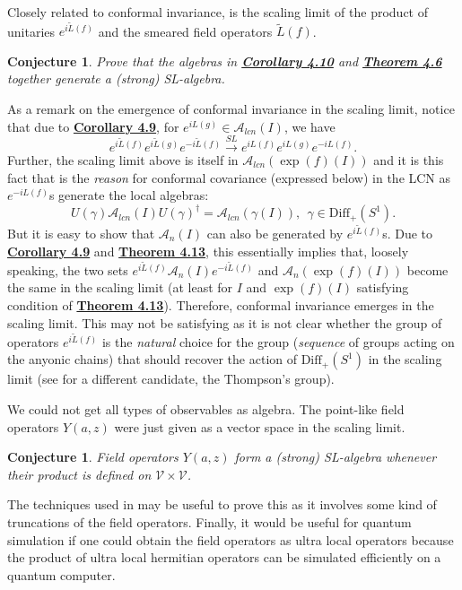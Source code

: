\documentclass[twoside,11pt,titlepage]{amsart}
\renewcommand{\=}[1]{\stackrel{#1}{=}} %
\newtheorem{cnj}[thm]{Conjecture}
\theoremstyle{definition}
\theoremstyle{remark}
\begin{document}
Closely related to conformal invariance, is the scaling limit of the product of unitaries $e^{i\widetilde{L}(f)}$ and the smeared field operators $\widetilde{L}(f)$.
\begin{cnj}\label{cnj5.3}
Prove that the algebras in \hyperref[cor4.10]{\textbf{Corollary 4.10}} and \hyperref[thm4.6]{\textbf{Theorem 4.6}} together generate a (strong) SL-algebra.
\end{cnj}

As a remark on the emergence of conformal invariance in the scaling limit, notice that due to \hyperref[cor4.9]{\textbf{Corollary 4.9}}, for $e^{iL(g)} \in \mathcal{A}_{lcn}(I)$, we have
$$e^{i\widetilde{L}(f)}e^{i\widetilde{L}(g)}e^{-i\widetilde{L}(f)} \xrightarrow{SL} e^{iL(f)}e^{iL(g)}e^{-iL(f)}.$$
Further, the scaling limit above is itself in $\mathcal{A}_{lcn}(\exp{(f)}(I))$ and it is this fact that is the \textit{reason} for conformal covariance (expressed below) in the LCN as $e^{-iL(f)}$s generate the local algebras:
$$U(\gamma)\mathcal{A}_{lcn}(I)U(\gamma)^\dagger=\mathcal{A}_{lcn}(\gamma(I)), \ \ \gamma \in \text{Diff}_+(S^1).$$
But it is easy to show that $\mathcal{A}_n(I)$ can also be generated by $e^{i\widetilde{L}(f)}$s. Due to \hyperref[cor4.9]{\textbf{Corollary 4.9}} and \hyperref[thm4.13]{\textbf{Theorem 4.13}}, this essentially implies that, loosely speaking, the two sets $e^{i\widetilde{L}(f)}\mathcal{A}_n(I)e^{-i\widetilde{L}(f)}$ and $\mathcal{A}_n(\exp{(f)}(I))$ become the same in the scaling limit (at least for $I$ and $\exp{(f)}(I)$ satisfying condition of \hyperref[thm4.13]{\textbf{Theorem 4.13}}). Therefore, conformal invariance emerges in the scaling limit. This may not be satisfying as it is not clear whether the group of operators $e^{i\widetilde{L}(f)}$ is the \textit{natural} choice for the group (\textit{sequence} of groups acting on the anyonic chains) that should recover the action of $\text{Diff}_+(S^1)$ in the scaling limit (see \cite{jones16} for a different candidate, the Thompson's group).

We could not get all types of observables as algebra. The point-like field operators $Y(a,z)$ were just given as a vector space in the scaling limit. 

\begin{cnj}\label{cnj5.4}
Field operators $Y(a,z)$ form a (strong) SL-algebra whenever their product is defined on $\mathcal{V} \times \mathcal{V}$.
\end{cnj}
The techniques used in \cite{konig2017matrix} may be useful to prove this as it involves some kind of truncations of the field operators. Finally, it would be useful for quantum simulation if one could obtain the field operators as ultra local operators because the product of ultra local hermitian operators can be simulated efficiently \cite[Claim 6.2]{aharonov2007polynomial} on a quantum computer.
\end{document}
